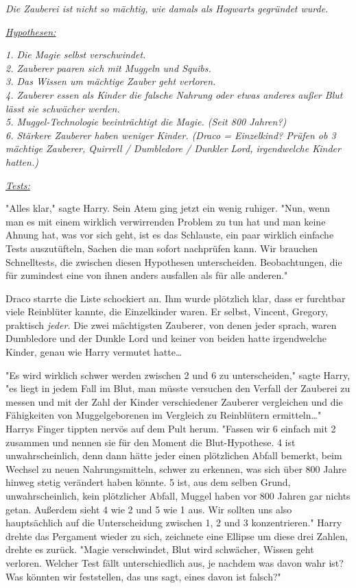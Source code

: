 {\emph{Die Zauberei ist nicht so mächtig, wie damals als Hogwarts gegründet wurde.}

\emph{\uline{Hypothesen:}}

\emph{1. Die Magie selbst verschwindet.\\ 2. Zauberer paaren sich mit Muggeln und Squibs.\\ 3. Das Wissen um mächtige Zauber geht verloren.\\ 4. Zauberer essen als Kinder die falsche Nahrung oder etwas anderes außer Blut lässt sie schwächer werden.\\ 5. Muggel-Technologie beeinträchtigt die Magie. (Seit 800 Jahren?)\\ 6. Stärkere Zauberer haben weniger Kinder. (Draco = Einzelkind? Prüfen ob 3 mächtige Zauberer, Quirrell / Dumbledore / Dunkler Lord, irgendwelche Kinder hatten.)}

\emph{\uline{Tests:}}

"Alles klar," sagte Harry. Sein Atem ging jetzt ein wenig ruhiger. "Nun, wenn man es mit einem wirklich verwirrenden Problem zu tun hat und man keine Ahnung hat, was vor sich geht, ist es das Schlauste, ein paar wirklich einfache Tests auszutüfteln, Sachen die man sofort nachprüfen kann. Wir brauchen Schnelltests, die zwischen diesen Hypothesen unterscheiden. Beobachtungen, die für zumindest eine von ihnen anders ausfallen als für alle anderen."

Draco starrte die Liste schockiert an. Ihm wurde plötzlich klar, dass er furchtbar viele Reinblüter kannte, die Einzelkinder waren. Er selbst, Vincent, Gregory, praktisch \emph{jeder.} Die zwei mächtigsten Zauberer, von denen jeder sprach, waren Dumbledore und der Dunkle Lord und keiner von beiden hatte irgendwelche Kinder, genau wie Harry vermutet hatte…

"Es wird wirklich schwer werden zwischen 2 und 6 zu unterscheiden," sagte Harry, "es liegt in jedem Fall im Blut, man müsste versuchen den Verfall der Zauberei zu messen und mit der Zahl der Kinder verschiedener Zauberer vergleichen und die Fähigkeiten von Muggelgeborenen im Vergleich zu Reinblütern ermitteln…" Harrys Finger tippten nervös auf dem Pult herum. "Fassen wir 6 einfach mit 2 zusammen und nennen sie für den Moment die Blut-Hypothese. 4 ist unwahrscheinlich, denn dann hätte jeder einen plötzlichen Abfall bemerkt, beim Wechsel zu neuen Nahrungsmitteln, schwer zu erkennen, was sich über 800 Jahre hinweg stetig verändert haben könnte. 5 ist, aus dem selben Grund, unwahrscheinlich, kein plötzlicher Abfall, Muggel haben vor 800 Jahren gar nichts getan. Außerdem sieht 4 wie 2 und 5 wie 1 aus. Wir sollten uns also hauptsächlich auf die Unterscheidung zwischen 1, 2 und 3 konzentrieren." Harry drehte das Pergament wieder zu sich, zeichnete eine Ellipse um diese drei Zahlen, drehte es zurück. "Magie verschwindet, Blut wird schwächer, Wissen geht verloren. Welcher Test fällt unterschiedlich aus, je nachdem was davon wahr ist? Was könnten wir feststellen, das uns sagt, eines davon ist falsch?"

}
